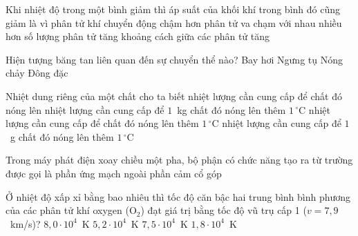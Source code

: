 	\begin{ex}%
		Khi nhiệt độ trong một bình giảm thì áp suất của khối khí trong bình đó cũng giảm là vì
		\choice
		{\True phân tử khí chuyển động chậm hơn}
		{phân tử va chạm với nhau nhiều hơn}
		{số lượng phân tử tăng}
		{khoảng cách giữa các phân tử tăng}
	\end{ex}

	\begin{ex}%
		Hiện tượng băng tan liên quan đến sự chuyển thể nào?
		\choice
		{Bay hơi}
		{Ngưng tụ}
		{\True Nóng chảy}
		{Đông đặc}
	\end{ex}

	\begin{ex}%
		Nhiệt dung riêng của một chất cho ta biết
		\choice
		{nhiệt lượng cần cung cấp để chất đó nóng lên}
		{\True nhiệt lượng cần cung cấp để $1$~kg chất đó nóng lên thêm $1\,^\circ\text{C}$}
		{nhiệt lượng cần cung cấp để chất đó nóng lên thêm $1\,^\circ\text{C}$}
		{nhiệt lượng cần cung cấp để $1$~g chất đó nóng lên thêm $1\,^\circ\text{C}$}
	\end{ex}

	\begin{ex}%
		Trong máy phát điện xoay chiều một pha, bộ phận có chức năng tạo ra từ trường được gọi là
		\choice
		{phần ứng}
		{mạch ngoài}
		{\True phần cảm}
		{cổ góp}
	\end{ex}

	\begin{ex}%
		Ở nhiệt độ xấp xỉ bằng bao nhiêu thì tốc độ căn bậc hai trung bình bình phương của các phân tử khí oxygen ($\text{O}_2$) đạt giá trị bằng tốc độ vũ trụ cấp 1 ($v=7{,}9$~km/s)?
		\choice
		{\True $8{,}0\cdot 10^4$~K}
		{$5{,}2\cdot 10^4$~K}
		{$7{,}5\cdot 10^4$~K}
		{$1{,}8\cdot 10^4$~K}
	\end{ex}

